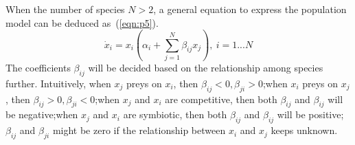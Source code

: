 When the number of species $N>2$, a general equation to express the population model can be deduced as~(\ref{eqn:p5}).
\begin{equation}\label{eqn:p5}
   \dot{x}_i = x_i(\alpha_i+ \sum_{j=1}^{N} \beta_{ij}x_j), ~i=1...N
\end{equation}
The coefficients $\beta_{ij}$ will be decided based on the relationship among species further. Intuitively, when $x_j$ preys on $x_i$, then $\beta_{ij}<0, \beta_{ji}>0$;when $x_i$ preys on $x_j$, then $\beta_{ij}>0, \beta_{ji}<0$;when $x_j$ and $x_i$ are competitive, then both $\beta_{ij}$ and $\beta_{ij}$ will be negative;when $x_j$ and $x_i$ are symbiotic, then both $\beta_{ij}$ and $\beta_{ij}$ will be positive;$\beta_{ij}$ and $\beta_{ji}$ might be zero if the relationship between $x_i$ and $x_j$ keeps unknown. 